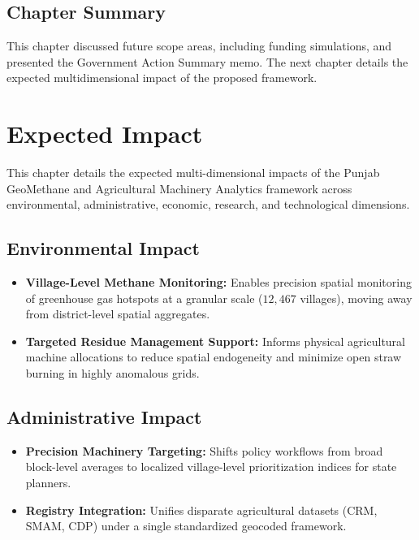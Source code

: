 \documentclass[12pt,a4paper]{report}
\begin{document}
\section{Chapter Summary}
This chapter discussed future scope areas, including funding simulations, and presented the Government Action Summary memo. The next chapter details the expected multidimensional impact of the proposed framework.

\chapter{Expected Impact}
\label{ch:expected_impact}

This chapter details the expected multi-dimensional impacts of the Punjab GeoMethane and Agricultural Machinery Analytics framework across environmental, administrative, economic, research, and technological dimensions.

\section{Environmental Impact}
\begin{itemize}
    \item \textbf{Village-Level Methane Monitoring:} Enables precision spatial monitoring of greenhouse gas hotspots at a granular scale ($12,467$ villages), moving away from district-level spatial aggregates.
    \item \textbf{Targeted Residue Management Support:} Informs physical agricultural machine allocations to reduce spatial endogeneity and minimize open straw burning in highly anomalous grids.
\end{itemize}

\section{Administrative Impact}
\begin{itemize}
    \item \textbf{Precision Machinery Targeting:} Shifts policy workflows from broad block-level averages to localized village-level prioritization indices for state planners.
    \item \textbf{Registry Integration:} Unifies disparate agricultural datasets (CRM, SMAM, CDP) under a single standardized geocoded framework.
\end{itemize}
\end{document}
